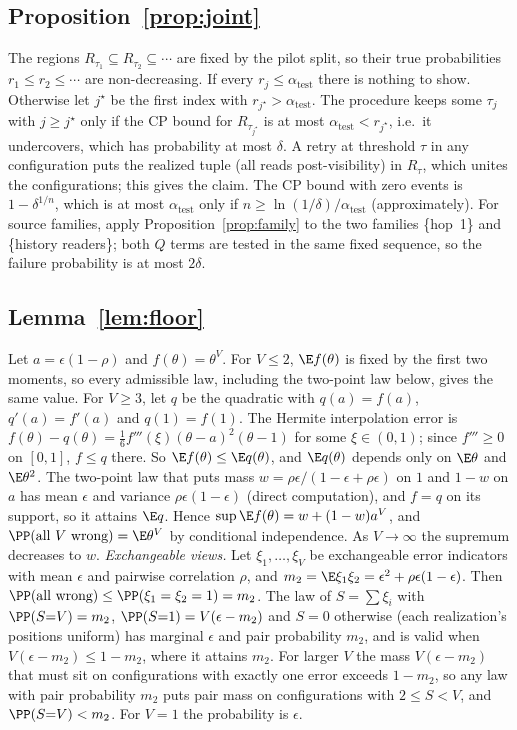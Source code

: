 \subsection{Proposition~\ref{prop:joint}}
The regions $R_{\tau_1}\subseteq R_{\tau_2}\subseteq\cdots$ are fixed by the pilot split, so their true probabilities $r_1\le r_2\le\cdots$ are non-decreasing. If every $r_j\le\alpha_{\mathrm{test}}$
there is nothing to show. Otherwise let $j^\star$ be the first index with $r_{j^\star}>\alpha_{\mathrm{test}}$. The procedure keeps some $\tau_j$ with $j\ge j^\star$ only if the CP bound for $R_{\tau_{j^\star}}$
is at most $\alpha_{\mathrm{test}}<r_{j^\star}$, i.e.\ it undercovers, which has probability at most $\delta$. A retry at threshold $\tau$ in any configuration puts the realized tuple (all reads post-visibility) in $R_\tau$, which unites the configurations; this gives
the claim. The CP bound with zero events is $1-\delta^{1/n}$, which is at most $\alpha_{\mathrm{test}}$ only if $n\ge\ln(1/\delta)/\alpha_{\mathrm{test}}$ (approximately). For source families,
apply Proposition~\ref{prop:family} to the two families \{hop~1\} and \{history readers\}; both $Q$ terms are tested in the same fixed sequence, so the failure probability is at most $2\delta$.

\subsection{Lemma~\ref{lem:floor}}
Let $a=\epsilon(1-\rho)$ and $f(\theta)=\theta^V$. For $V\le2$, $\E f(\theta)$ is fixed by the first two moments, so every admissible law, including the two-point law below, gives the same
value. For $V\ge3$, let $q$ be the quadratic with $q(a)=f(a)$, $q'(a)=f'(a)$ and $q(1)=f(1)$. The Hermite interpolation error is $f(\theta)-q(\theta)=\tfrac{1}{6}f'''(\xi)(\theta-a)^2(\theta-1)$
for some $\xi\in(0,1)$; since $f'''\ge0$ on $[0,1]$, $f\le q$ there. So $\E f(\theta)\le\E q(\theta)$, and $\E q(\theta)$ depends only on $\E\theta$ and $\E\theta^2$. The two-point law
that puts mass $w=\rho\epsilon/(1-\epsilon+\rho\epsilon)$ on $1$ and $1-w$ on $a$ has mean $\epsilon$ and variance $\rho\epsilon(1-\epsilon)$ (direct computation), and $f=q$ on its support,
so it attains $\E q$. Hence $\sup\E f(\theta)=w+(1-w)a^V$, and $\PP(\text{all $V$ wrong})=\E\theta^V$ by conditional independence. As $V\to\infty$ the supremum decreases to $w$.
\emph{Exchangeable views.} Let $\xi_1,\dots,\xi_V$ be exchangeable error indicators with mean $\epsilon$ and pairwise correlation $\rho$, and $m_2=\E\xi_1\xi_2=\epsilon^2+\rho\epsilon(1-\epsilon)$.
Then $\PP(\text{all wrong})\le\PP(\xi_1=\xi_2=1)=m_2$. The law of $S=\sum\xi_i$ with $\PP(S{=}V)=m_2$, $\PP(S{=}1)=V(\epsilon-m_2)$ and $S=0$ otherwise (each realization's positions uniform)
has marginal $\epsilon$ and pair probability $m_2$, and is valid when $V(\epsilon-m_2)\le1-m_2$, where it attains $m_2$. For larger $V$ the mass $V(\epsilon-m_2)$ that
must sit on configurations with exactly one error exceeds $1-m_2$, so any law with pair probability $m_2$ puts pair mass on configurations with $2\le S<V$, and
$\PP(S{=}V)<m_2$. For $V{=}1$ the probability is $\epsilon$.

